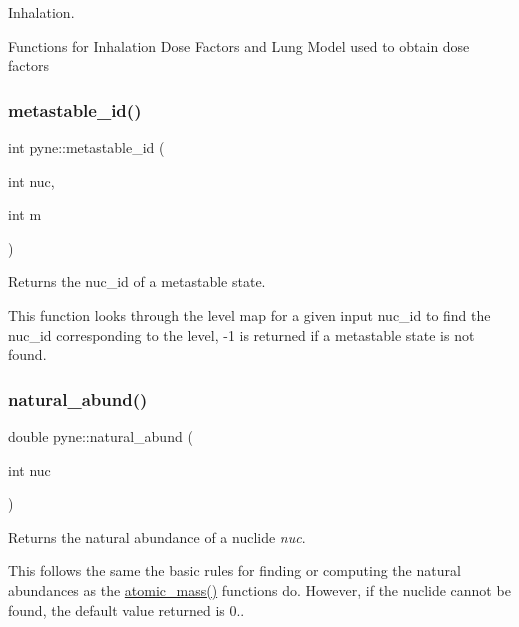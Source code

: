 Inhalation. 

Functions for Inhalation Dose Factors and Lung Model used to obtain dose factors \mbox{\label{namespacepyne_a2e817a4d6dac740b6fa883ac99272201}} 
\subsubsection{\texorpdfstring{metastable\+\_\+id()}{metastable\_id()}}
{\footnotesize\ttfamily int pyne\+::metastable\+\_\+id (\begin{DoxyParamCaption}\item[{int}]{nuc,  }\item[{int}]{m }\end{DoxyParamCaption})}



Returns the nuc\+\_\+id of a metastable state. 

This function looks through the level map for a given input nuc\+\_\+id to find the nuc\+\_\+id corresponding to the level, -\/1 is returned if a metastable state is not found. \mbox{\label{namespacepyne_aa34a8311add97b0e90ce7600aa86f000}} 
\subsubsection{\texorpdfstring{natural\+\_\+abund()}{natural\_abund()}}
{\footnotesize\ttfamily double pyne\+::natural\+\_\+abund (\begin{DoxyParamCaption}\item[{int}]{nuc }\end{DoxyParamCaption})}



Returns the natural abundance of a nuclide {\itshape nuc}. 

This follows the same the basic rules for finding or computing the natural abundances as the \hyperlink{namespacepyne_aaab79c2417fc60c1a248dd702403befb}{atomic\+\_\+mass()} functions do. However, if the nuclide cannot be found, the default value returned is 0.. \mbox{\label{namespacepyne_aa136c046c495673c1167472b96901e33}} 
